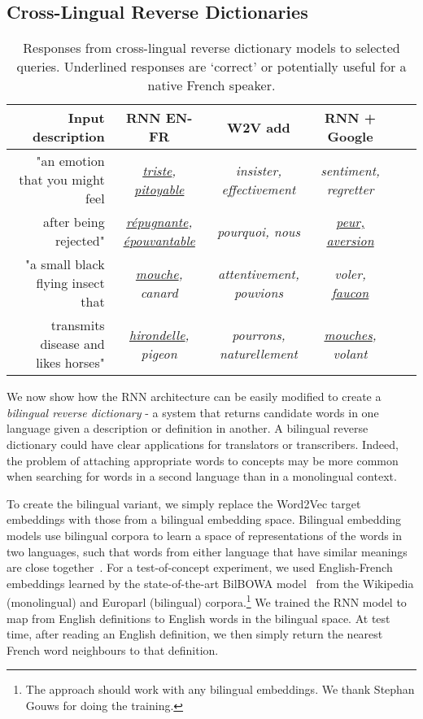 \documentclass[11pt,letterpaper]{article}
\begin{document}
  
\subsection{Cross-Lingual Reverse Dictionaries}

\begin{table*}[ht]
{\small
\emph
\hfill{}
\begin{tabular}{r|ccccc|}
\bf Input description & \bf RNN EN-FR & \bf W2V add &  \bf RNN + Google  \\
\hline
  "an emotion that you might feel & \emph{ \underline{triste}, \underline{pitoyable}} & \emph {insister, effectivement} & \emph{ sentiment, regretter} \\


after being rejected" & \emph{ \underline{r\'epugnante}, \underline{\'epouvantable}} & \emph{pourquoi, nous} &\emph{  \underline{peur, aversion} } \\
\rule{0pt}{3ex} 
"a small black flying insect that  & \emph{\underline{mouche}, canard} & \emph {attentivement, pouvions} & \emph{ voler, \underline{faucon}} \\ 
transmits disease and likes horses" &  \emph{  \underline{hirondelle}, pigeon} & \emph{pourrons, naturellement} & \emph{\underline{mouches}, volant} \\
\end{tabular}}
\hfill{}
\caption{Responses from cross-lingual reverse dictionary models to selected queries. Underlined responses are `correct' or potentially useful for a native French speaker.}
\label{cross}
\end{table*}


We now show how the RNN architecture can be easily modified to create a \emph{bilingual reverse dictionary} - a system that returns candidate words in one language given a description or definition in another. A bilingual reverse dictionary could have clear applications for translators or transcribers. Indeed, the problem of attaching appropriate words to concepts may be more common when searching for words in a  second language than in a monolingual context.  

To create the bilingual variant, we simply replace the Word2Vec target embeddings with those from a bilingual embedding space. Bilingual embedding models use bilingual corpora to learn a space of representations of the words in two languages, such that words from either language that have similar meanings are close together~\cite{hermann2013multilingual,lauly2014autoencoder,gouws2014bilbowa}. For a test-of-concept experiment, we used English-French embeddings learned by the state-of-the-art BilBOWA model~\cite{gouws2014bilbowa} from the Wikipedia (monolingual) and Europarl (bilingual) corpora.\footnote{The approach should work with any bilingual embeddings. We thank Stephan Gouws for doing the training.} We trained the RNN model to map from English definitions to English words in the bilingual space. At test time, after reading an English definition, we then simply return the nearest French word neighbours to that definition.  
\end{document}
